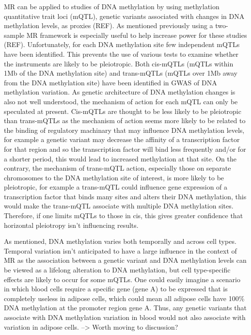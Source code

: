 \documentclass[11pt,twoside]{bristolthesis}
\begin{document}
MR can be applied to studies of DNA methylation by using methylation quantitative trait loci (mQTL), genetic variants associated with changes in DNA methylation levels, as proxies (REF). As mentioned previously using a two-sample MR framework is especially useful to help increase power for these studies (REF). Unfortunately, for each DNA methylation site few independent mQTLs have been identified. This prevents the use of various tests to examine whether the instruments are likely to be pleiotropic. Both cis-mQTLs (mQTLs within 1Mb of the DNA methylation site) and trans-mQTLs (mQTLs over 1Mb away from the DNA methylation site) have been identified in GWAS of DNA methylation variation. As genetic architecture of DNA methylation changes is also not well understood, the mechanism of action for each mQTL can only be speculated at present. Cis-mQTLs are thought to be less likely to be pleiotropic than trans-mQTLs as the mechanism of action seems more likely to be related to the binding of regulatory machinary that may influence DNA methylation levels, for example a genetic variant may decrease the affinity of a transcription factor for that region and so the transcription factor will bind less frequently and/or for a shorter period, this would lead to increased methylation at that site. On the contrary, the mechanism of trans-mQTL action, especially those on separate chromosomes to the DNA methylation site of interest, is more likely to be pleiotropic, for example a trans-mQTL could influence gene expression of a transcription factor that binds many sites and alters their DNA methylation, this would make the trans-mQTL associate with multiple DNA methylation sites. Therefore, if one limits mQTLs to those in cis, this gives greater confidence that horizontal pleiotropy isn't influencing results.

As mentioned, DNA methylation varies both temporally and across cell types. Temporal variation isn't anticipated to have a large influence in the context of MR as the association between a genetic variant and DNA methylation levels can be viewed as a lifelong alteration to DNA methylation, but cell type-specific effects are likely to occur for some mQTLs. One could easily imagine a scenario in which blood cells require a specific gene (gene A) to be expressed that is completely useless in adipose cells, which could mean all adipose cells have 100\% DNA methylation at the promoter region gene A. Thus, any genetic variants that associate with DNA methylation variation in blood would not also associate with variation in adipose cells. --\textgreater{} Worth moving to discussion?
\end{document}
